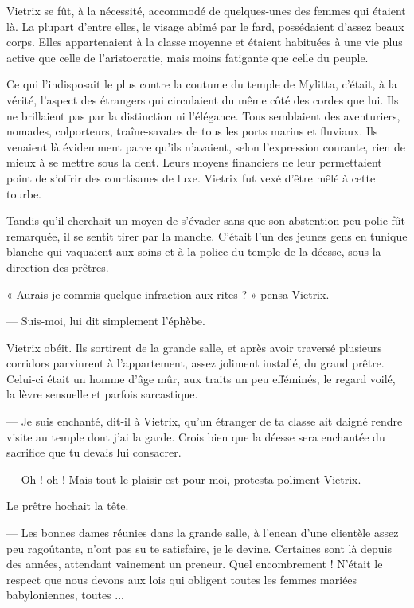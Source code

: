\documentclass[a4paper, 11pt, oneside, polutonikogreek, french]{article}
\begin{document}
Vietrix se fût, à la nécessité, accommodé de quelques-unes des femmes qui étaient là. La plupart d'entre elles, le visage abîmé par le fard, possédaient d'assez beaux corps. Elles appartenaient à la classe moyenne et étaient habituées à une vie plus active que celle de l'aristocratie, mais moins fatigante que celle du peuple.

Ce qui l'indisposait le plus contre la coutume du temple de Mylitta, c'était, à la vérité, l'aspect des étrangers qui circulaient du même côté des cordes que lui. Ils ne brillaient pas par la distinction ni l'élégance. Tous semblaient des aventuriers, nomades, colporteurs, traîne-savates de tous les ports marins et fluviaux. Ils venaient là évidemment parce qu'ils n'avaient, selon l'expression courante, rien de mieux à se mettre sous la dent. Leurs moyens financiers ne leur permettaient point de s'offrir des courtisanes de luxe. Vietrix fut vexé d'être mêlé à cette tourbe.

\bigskip
\centerline{\EightStarTaper}
\centerline{\EightStarTaper\EightStarTaper}
\bigskip

Tandis qu'il cherchait un moyen de s'évader sans que son abstention peu polie fût remarquée, il se sentit tirer par la manche. C'était l'un des jeunes gens en tunique blanche qui vaquaient aux soins et à la police du temple de la déesse, sous la direction des prêtres.

« Aurais-je commis quelque infraction aux rites ? » pensa Vietrix.

--- Suis-moi, lui dit simplement l'éphèbe.

Vietrix obéit. Ils sortirent de la grande salle, et après avoir traversé plusieurs corridors parvinrent à l'appartement, assez joliment installé, du grand prêtre. Celui-ci était un homme d'âge mûr, aux traits un peu efféminés, le regard voilé, la lèvre sensuelle et parfois sarcastique.

--- Je suis enchanté, dit-il à Vietrix, qu'un étranger de ta classe ait daigné rendre visite au temple dont j'ai la garde. Crois bien que la déesse sera enchantée du sacrifice que tu devais lui consacrer.

--- Oh ! oh ! Mais tout le plaisir est pour moi, protesta poliment Vietrix.

Le prêtre hochait la tête.

--- Les bonnes dames réunies dans la grande salle, à l'encan d'une clientèle assez peu ragoûtante, n'ont pas su te satisfaire, je le devine. Certaines sont là depuis des années, attendant vainement un preneur. Quel encombrement ! N'était le respect que nous devons aux lois qui obligent toutes les femmes mariées babyloniennes, toutes ...
\end{document}
